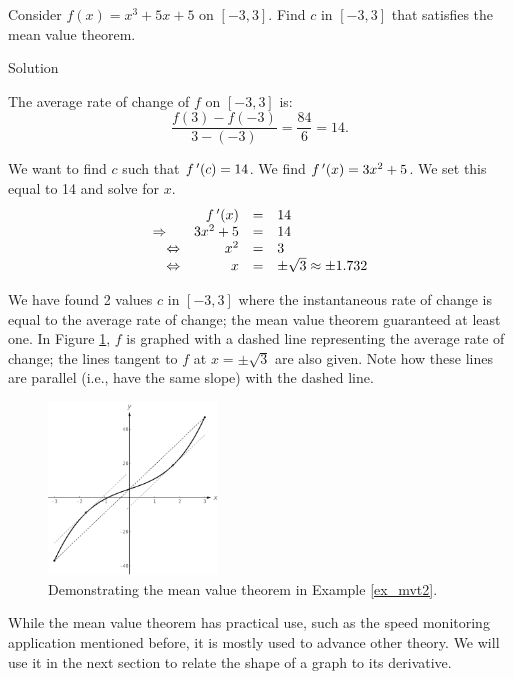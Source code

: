\begin{example}\label{ex_mvt2}

Consider $f(x) = x^3+5x+5$ on $[-3,3]$. Find $c$ in $[-3,3]$ that satisfies the mean value theorem.

Solution 

The average rate of change of $f$ on $[-3,3]$ is:
		$$\frac{f(3)-f(-3)}{3-(-3)} = \frac{84}{6} = 14.$$
		
We want to find $c$ such that $f\,'(c) = 14$. We find $f\,'(x) = 3x^2+5$. We set this equal to 14 and solve for $x$. 
\[ \begin{array}{rrcl}
		& f\,'(x) &=& 14 \\
		\Rightarrow \quad & 3x^2 +5 &= & 14\\
		\Leftrightarrow & x^2  &=& 3\\
		\Leftrightarrow & x &=& \pm \sqrt{3} \approx \pm 1.732
\end{array}\] 
	
We have found 2 values $c$ in $[-3,3]$ where the instantaneous rate of change is equal to the average rate of change; the mean value theorem guaranteed at least one. In Figure \ref{fig_behaviour_8}, $f$ is graphed with a dashed line representing the average rate of change; the lines tangent to $f$ at $x=\pm \sqrt{3}$ are also given. Note how these lines are parallel (i.e., have the same slope) with the dashed line.
\begin{figure}[H]
	\begin{center}
			\includegraphics[width=0.4\textwidth]{fig_behaviour_8}
	\caption{Demonstrating the mean value theorem in Example \ref{ex_mvt2}.}
	\label{fig_behaviour_8}
	\end{center}
\end{figure}

\end{example}

While the mean value theorem has practical use, such as the speed monitoring application mentioned before, it is mostly used to advance other theory. We will use it in the next section to relate  the shape of a graph to its derivative.


